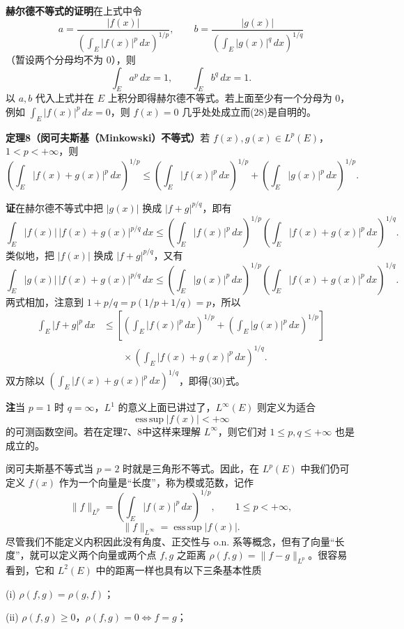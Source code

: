 \noindent\textbf{赫尔德不等式的证明}\quad 在上式中令
\[
 a=\frac{|f(x)|}{\left(\int_E|f(x)|^p\,dx\right)^{1/p}},\qquad
 b=\frac{|g(x)|}{\left(\int_E|g(x)|^q\,dx\right)^{1/q}}
\]
（暂设两个分母均不为 $0$），则
\[
 \int_Ea^p\,dx=1,\qquad \int_Eb^q\,dx=1.
\]
以 $a,b$ 代入上式并在 $E$ 上积分即得赫尔德不等式。若上面至少有一个分母为 $0$，例如 $\int_E|f(x)|^p\,dx=0$，则 $f(x)=0$ 几乎处处成立而(28)是自明的。

\noindent\textbf{定理8（闵可夫斯基（Minkowski）不等式）}\quad 若 $f(x),g(x)\in L^p(E)$，$1<p<+\infty$，则
\begin{equation}
 \left(\int_E|f(x)+g(x)|^p\,dx\right)^{1/p}
 \le\left(\int_E|f(x)|^p\,dx\right)^{1/p}+\left(\int_E|g(x)|^p\,dx\right)^{1/p}.
 \tag{30}
\end{equation}

\noindent\textbf{证}\quad 在赫尔德不等式中把 $|g(x)|$ 换成 $|f+g|^{p/q}$，即有
\[
 \int_E|f(x)|\,|f(x)+g(x)|^{p/q}\,dx
 \le\left(\int_E|f(x)|^p\,dx\right)^{1/p}
 \left(\int_E|f(x)+g(x)|^p\,dx\right)^{1/q}.
\]
类似地，把 $|f(x)|$ 换成 $|f+g|^{p/q}$，又有
\[
 \int_E|g(x)|\,|f(x)+g(x)|^{p/q}\,dx
 \le\left(\int_E|g(x)|^p\,dx\right)^{1/p}
 \left(\int_E|f(x)+g(x)|^p\,dx\right)^{1/q}.
\]
两式相加，注意到 $1+p/q=p(1/p+1/q)=p$，所以
\[
\begin{aligned}
 \int_E|f+g|^p\,dx
 &\le\left[\left(\int_E|f(x)|^p\,dx\right)^{1/p}
 +\left(\int_E|g(x)|^p\,dx\right)^{1/p}\right]\\
 &\qquad\times\left(\int_E|f(x)+g(x)|^p\,dx\right)^{1/q}.
\end{aligned}
\]
双方除以 $\left(\int_E|f(x)+g(x)|^p\,dx\right)^{1/q}$，即得(30)式。

\noindent\textbf{注}\quad 当 $p=1$ 时 $q=\infty$，$L^1$ 的意义上面已讲过了，$L^\infty(E)$ 则定义为适合
\[
 \operatorname{ess\,sup}|f(x)|<+\infty
\]
的可测函数空间。若在定理7、8中这样来理解 $L^\infty$，则它们对 $1\le p,q\le+\infty$ 也是成立的。

闵可夫斯基不等式当 $p=2$ 时就是三角形不等式。因此，在 $L^p(E)$ 中我们仍可定义 $f(x)$ 作为一个向量是“长度”，称为模或范数，记作
\[
 \|f\|_{L^p}=\left(\int_E|f(x)|^p\,dx\right)^{1/p},\qquad 1\le p<+\infty,
\]
\[
 \|f\|_{L^\infty}=\operatorname{ess\,sup}|f(x)|.
\]
尽管我们不能定义内积因此没有角度、正交性与 o.n. 系等概念，但有了向量“长度”，就可以定义两个向量或两个点 $f,g$ 之距离 $\rho(f,g)=\|f-g\|_{L^p}$。很容易看到，它和 $L^2(E)$ 中的距离一样也具有以下三条基本性质

(i) $\rho(f,g)=\rho(g,f)$；

(ii) $\rho(f,g)\ge0$，$\rho(f,g)=0\Leftrightarrow f=g$；

